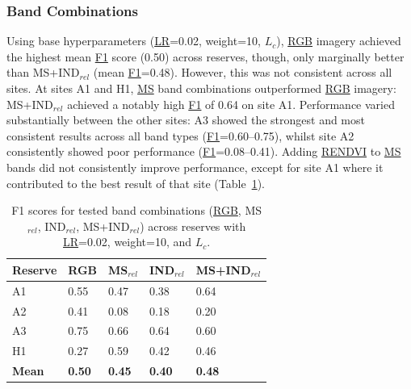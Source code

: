 \documentclass[
]{scrreprt}
\begin{document}
\begin{table}[H]
\begin{minipage}{\linewidth}
{}

\end{minipage}%

\end{table}%

\subsubsection{Band Combinations}\label{band-combinations}

Using base hyperparameters (\hyperref[acronyms_LR]{LR}=0.02, weight=10,
\hyperref[acronyms_WBCE_D]{\(L_{c}\)}), \hyperref[acronyms_RGB]{RGB}
imagery achieved the highest mean \hyperref[acronyms_F1]{F1} score
(0.50) across reserves, though, only marginally better than
MS+IND\(_{rel}\) (mean \hyperref[acronyms_F1]{F1}=0.48). However, this
was not consistent across all sites. At sites A1 and H1,
\hyperref[acronyms_MS]{MS} band combinations outperformed
\hyperref[acronyms_RGB]{RGB} imagery: MS+IND\(_{rel}\) achieved a
notably high \hyperref[acronyms_F1]{F1} of 0.64 on site A1. Performance
varied substantially between the other sites: A3 showed the strongest
and most consistent results across all band types
(\hyperref[acronyms_F1]{F1}=0.60--0.75), whilst site A2 consistently
showed poor performance (\hyperref[acronyms_F1]{F1}=0.08--0.41). Adding
\hyperref[acronyms_RENDVI]{RENDVI} to \hyperref[acronyms_MS]{MS} bands
did not consistently improve performance, except for site A1 where it
contributed to the best result of that site (Table~\ref{tbl-bands}).

\begin{longtable}[]{@{}lllll@{}}

\caption{\label{tbl-bands}F1 scores for tested band combinations
(\hyperref[acronyms_RGB]{RGB}, MS\(_{rel}\), IND\(_{rel}\),
MS+IND\(_{rel}\)) across reserves with \hyperref[acronyms_LR]{LR}=0.02,
weight=10, and \hyperref[acronyms_WBCE_D]{\(L_{c}\)}.}

\tabularnewline

\toprule\noalign{}
Reserve & RGB & MS\(_{rel}\) & IND\(_{rel}\) & MS+IND\(_{rel}\) \\
\midrule\noalign{}
\endhead
\bottomrule\noalign{}
\endlastfoot
A1 & 0.55 & 0.47 & 0.38 & 0.64 \\
A2 & 0.41 & 0.08 & 0.18 & 0.20 \\
A3 & 0.75 & 0.66 & 0.64 & 0.60 \\
H1 & 0.27 & 0.59 & 0.42 & 0.46 \\
\textbf{Mean} & \textbf{0.50} & \textbf{0.45} & \textbf{0.40} &
\textbf{0.48} \\

\end{longtable}
\end{document}
